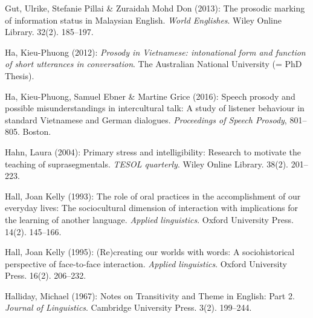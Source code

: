\begin{styleBibliography}
Gut, Ulrike, Stefanie Pillai \& Zuraidah Mohd Don (2013): The prosodic marking of information status in Malaysian English. \textit{World Englishes}. Wiley Online Library. 32(2). 185–197.
\end{styleBibliography}

\begin{styleBibliography}
Ha, Kieu-Phuong (2012): \textit{Prosody in Vietnamese: intonational form and function of short utterances in conversation}. The Australian National University (= PhD Thesis).
\end{styleBibliography}

\begin{styleBibliography}
Ha, Kieu-Phuong, Samuel Ebner \& Martine Grice (2016): Speech prosody and possible misunderstandings in intercultural talk: A study of listener behaviour in standard Vietnamese and German dialogues. \textit{Proceedings of Speech Prosody}, 801–805. Boston.
\end{styleBibliography}

\begin{styleBibliography}
Hahn, Laura (2004): Primary stress and intelligibility: Research to motivate the teaching of suprasegmentals. \textit{TESOL quarterly}. Wiley Online Library. 38(2). 201–223.
\end{styleBibliography}

\begin{styleBibliography}
Hall, Joan Kelly (1993): The role of oral practices in the accomplishment of our everyday lives: The sociocultural dimension of interaction with implications for the learning of another language. \textit{Applied linguistics}. Oxford University Press. 14(2). 145–166.
\end{styleBibliography}

\begin{styleBibliography}
Hall, Joan Kelly (1995): (Re)creating our worlds with words: A sociohistorical perspective of face-to-face interaction. \textit{Applied linguistics}. Oxford University Press. 16(2). 206–232.
\end{styleBibliography}

\begin{styleBibliography}
Halliday, Michael (1967): Notes on Transitivity and Theme in English: Part 2. \textit{Journal of Linguistics}. Cambridge University Press. 3(2). 199–244.
\end{styleBibliography}


